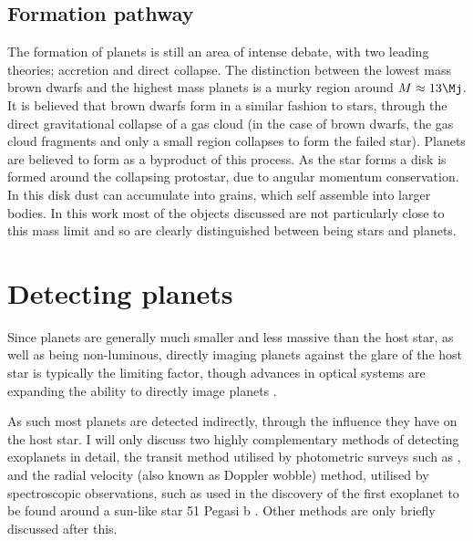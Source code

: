 \subsection{Formation pathway}
The formation of planets is still an area of intense debate, with two leading theories; accretion and direct collapse. The distinction between the lowest mass brown dwarfs and the highest mass planets is a murky region around $M\approx13\Mj$. It is believed that brown dwarfs form in a similar fashion to stars, through the direct gravitational collapse of a gas cloud (in the case of brown dwarfs, the gas cloud fragments and only a small region collapses to form the failed star). Planets are believed to form as a byproduct of this process. As the star forms a disk is formed around the collapsing protostar, due to angular momentum conservation. In this disk dust can accumulate into grains, which self assemble into larger bodies. In this work most of the objects discussed are not particularly close to this mass limit and so are clearly distinguished between being stars and planets. 


\section{Detecting planets}
Since planets are generally much smaller and less massive than the host star, as well as being non-luminous, directly imaging planets against the glare of the host star is typically the limiting factor, though advances in optical systems are expanding the ability to directly image planets \citep{2013Kuzuhara}. 

As such most planets are detected indirectly, through the influence they have on the host star. I will only discuss two highly complementary methods of detecting exoplanets in detail, the transit method utilised by photometric surveys such as \Kepler, and the radial velocity (also known as Doppler wobble) method, utilised by spectroscopic observations, such as used in the discovery of the first exoplanet to be found around a sun-like star 51 Pegasi b \citep{51peg}. Other methods are only briefly discussed after this.
